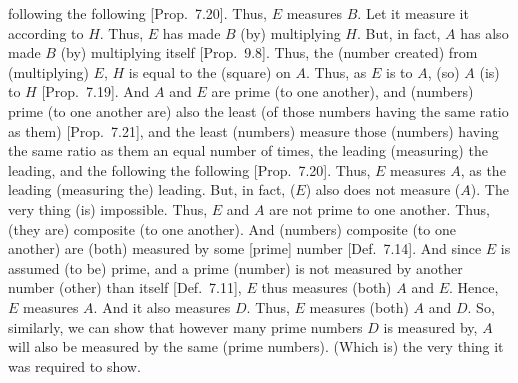 \begin{Parallel}{}{}
{following the following [Prop.~7.20]. Thus, $E$
measures $B$. Let it measure it according to $H$. Thus, $E$ has made $B$ (by) multiplying $H$. But, in fact, $A$ has also made $B$
(by) multiplying itself [Prop.~9.8].  Thus, the (number created) from (multiplying) $E$, $H$ is equal to the (square) on $A$.
Thus, as $E$ is to $A$, (so) $A$ (is) to $H$ [Prop.~7.19]. And $A$ and $E$
 are prime (to one another), and (numbers) prime (to one another are) also the least (of those
numbers having the same ratio as them) [Prop.~7.21],
and the least (numbers) measure those (numbers) having the same ratio  as them an equal number of times, the leading (measuring) the leading, and the
following the following
[Prop.~7.20]. Thus, $E$
measures $A$, as the leading (measuring the) leading. But, in fact, 
($E$) also does not measure ($A$). The very thing (is) impossible. Thus,
$E$ and $A$ are not prime to one another. Thus, (they are) composite (to one another). And (numbers) composite (to one another) are (both) measured
by some [prime] number [Def.~7.14]. And since $E$
is assumed (to be) prime, and a prime (number) is not measured by  another number (other) than itself
[Def.~7.11], $E$ thus measures (both) $A$ and $E$. Hence, $E$ measures $A$. And it also measures $D$. Thus, $E$ measures (both) $A$ and $D$. So, similarly, we can show that however many prime
numbers $D$ is measured by, $A$ will also be measured by the same
(prime numbers). (Which is) the very thing it was required to show.}
\end{Parallel}


